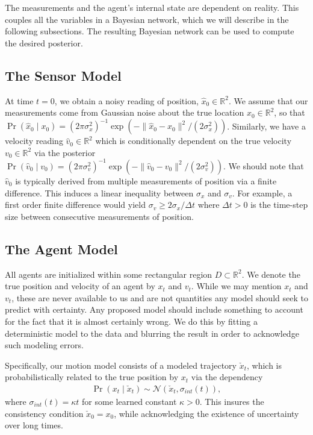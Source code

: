 \documentclass[conference]{IEEEtran}
\begin{document}
The measurements and the agent's internal state are dependent on reality.  This couples all the variables in a Bayesian network, which we will describe in the following subsections.
The resulting Bayesian network can be used to compute the desired posterior.

\subsection{The Sensor Model}
At time $t=0$, we obtain a noisy reading of position, $\hat{x}_0 \in \mathbb{R}^2$.
We assume that our measurements come from Gaussian noise about the true location $x_0 \in \mathbb{R}^2$,
so that $\Pr(\hat{x}_0 \mid x_0 ) = (2\pi \sigma_x^2)^{-1} \exp( - \| \hat{x}_0 - x_0 \|^2 / (2 \sigma_x^2) )$.
Similarly, we have a velocity reading $\hat{v}_0 \in \mathbb{R}^2$ which is conditionally dependent on the true velocity $v_0 \in \mathbb{R}^2$
via the posterior $\Pr( \hat{v}_0 \mid v_0 ) = (2\pi \sigma_v^2)^{-1} \exp( - \| \hat{v}_0 - v_0 \|^2 / (2 \sigma_v^2) )$.
We should note that $\hat{v}_0$ is typically derived from multiple measurements of position via a finite difference.
This induces a linear inequality between $\sigma_x$ and $\sigma_v$.
For example, a first order finite difference would yield $\sigma_v \geq 2 \sigma_x / \Delta t$ where $\Delta t > 0$ is the time-step size between consecutive measurements of position.

\subsection{The Agent Model}
All agents are initialized within some rectangular region $D \subset \mathbb{R}^2$.
We denote the true position and velocity of an agent by $x_t$ and $v_t$.
While we may mention $x_t$ and $v_t$, these are never available to us and are not quantities any model should seek to predict with certainty.
Any proposed model should include something to account for the fact that it is almost certainly wrong.
We do this by fitting a deterministic model to the data and blurring the result in order to acknowledge such modeling errors.

Specifically, our motion model consists of a modeled trajectory $\check{x}_t$, which is probabilistically related to the true position by $x_t$ via the dependency
\begin{align*}
	\Pr( x_t \mid \check{x}_t ) \sim \mathcal{N}( \check{x}_t, \sigma_{int}(t)),
\end{align*}
where $\sigma_{int}(t) = \kappa t$ for some learned constant $\kappa > 0$.
This insures the consistency condition $\check{x}_0 = x_0$, while acknowledging the existence of uncertainty over long times.
\end{document}
